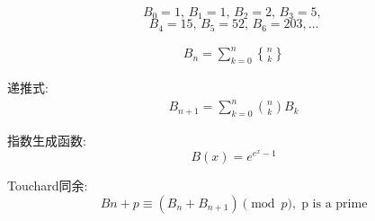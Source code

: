 $$B_0 = 1,\, B_1 = 1,\, B_2 = 2,\, B_3 = 5,\,$$
$$B_4 = 15,\, B_5 = 52,\, B_6 = 203, \dots$$

$$\begin{aligned}B_n = \sum_{k = 0} ^ n {n\brace k}\end{aligned}$$

递推式:
$$\begin{aligned}
B_{n + 1} = \sum_{k = 0} ^n {n\choose k} B_k
\end{aligned}$$

指数生成函数: $$B(x) = e^{e^x - 1}$$

Touchard同余: $$B{n + p} \equiv (B_n + B_{n + 1}) \pmod p,\;\text{p is a prime}$$
